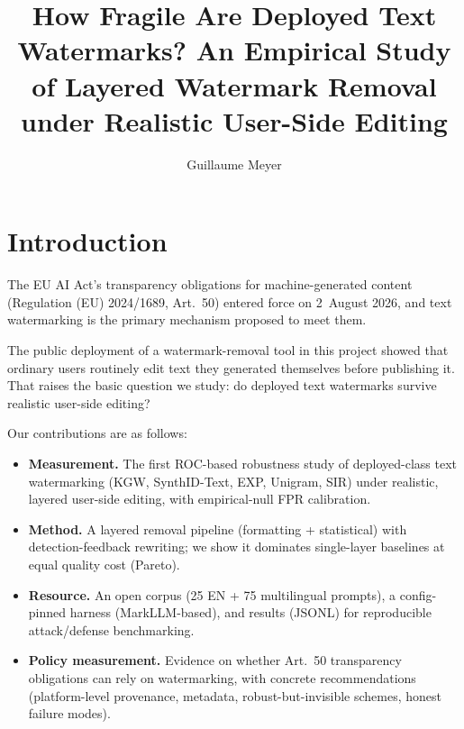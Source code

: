 \documentclass[10pt,letterpaper]{article}
\title{How Fragile Are Deployed Text Watermarks? An Empirical Study of
Layered Watermark Removal under Realistic User-Side Editing}
\author{Guillaume Meyer}
\date{}   %
\begin{document}
\maketitle

\begin{abstract}

\end{abstract}

\section{Introduction}

The EU AI Act's transparency obligations for machine-generated content
(Regulation (EU) 2024/1689, Art.~50) \citep{euaiact2024} entered force
on 2~August 2026, and text watermarking is the primary mechanism
proposed to meet them. %

The public deployment of a watermark-removal tool in this project showed
that ordinary users routinely edit text they generated themselves
before publishing it. That raises the basic question we study: do
deployed text watermarks survive realistic user-side editing?

Our contributions are as follows:
\begin{itemize}
  \item \textbf{Measurement.} The first ROC-based robustness study of
  deployed-class text watermarking (KGW, SynthID-Text, EXP, Unigram,
  SIR) under realistic, layered user-side editing, with empirical-null
  FPR calibration.
  \item \textbf{Method.} A layered removal pipeline (formatting +
  statistical) with detection-feedback rewriting; we show it dominates
  single-layer baselines at equal quality cost (Pareto).
  \item \textbf{Resource.} An open corpus (25 EN + 75 multilingual
  prompts), a config-pinned harness (MarkLLM-based), and results
  (JSONL) for reproducible attack/defense benchmarking.
  \item \textbf{Policy measurement.} Evidence on whether Art.~50
  transparency obligations can rely on watermarking, with concrete
  recommendations (platform-level provenance, metadata,
  robust-but-invisible schemes, honest failure modes).
\end{itemize}
\end{document}
